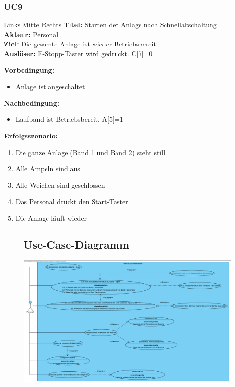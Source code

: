 \documentclass[oneside,a4paper,titlepage]{scrartcl} %
\begin{document}
\subsubsection{UC9}
\begin{tabbing}
 Links \= Mitte \= Rechts \kill
 \textbf{Titel:} \> \> Starten der Anlage nach Schnellabschaltung\\
 \textbf{Akteur:} \> \> Personal\\
 \textbf{Ziel:} \> \> Die gesamte Anlage ist wieder Betriebsbereit\\
 \textbf{Auslöser:} \> \> E-Stopp-Taster wird gedrückt. C[7]=0\\
\end{tabbing}
\textbf{Vorbedingung:}
\begin{itemize}
 \item Anlage ist angeschaltet
\end{itemize}
\textbf{Nachbedingung:}
\begin{itemize}
 \item Laufband ist Betriebsbereit. A[5]=1
\end{itemize}
\textbf{Erfolgsszenario:}
\begin{enumerate}
 \item Die ganze Anlage (Band 1 und Band 2) steht still
 \item Alle Ampeln sind aus
 \item Alle Weichen sind geschlossen
 \item Das Personal drückt den Start-Taster
 \item Die Anlage läuft wieder
\end{enumerate}

\begin{figure}
 \subsection{Use-Case-Diagramm}
 \centering\vfill\includegraphics[angle=90,scale=0.7]{imgs/UseCases.png}
\end{figure}
\end{document}
